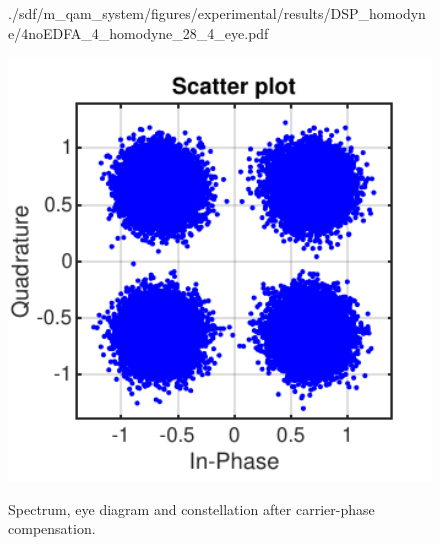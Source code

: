 \begin{figure}[H]
\begin{minipage}{0.30\textwidth}
			{./sdf/m_qam_system/figures/experimental/results/DSP_homodyne/4noEDFA_4_homodyne_28_4_eye.pdf}
			\label{fig:16GBdSpecMF}
		\end{minipage}
		\begin{minipage}{0.30\textwidth}
			\centering
			\includegraphics[width=1\textwidth]
			{./sdf/m_qam_system/figures/experimental/results/DSP_homodyne/4noEDFA_4_homodyne_28_4_const.pdf}\\
			\label{fig:16GBdSpecBefFec}
		\end{minipage}
		\caption{Spectrum, eye diagram and constellation after carrier-phase
		compensation.}
		\label{fig:16GBMFHm}
	\end{figure}


